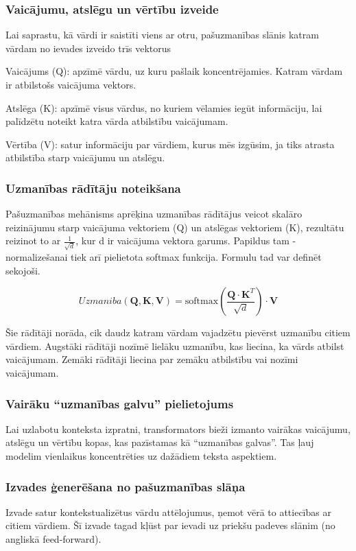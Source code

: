 \subsubsection{Vaicājumu, atslēgu un vērtību izveide}
Lai saprastu, kā vārdi ir saistīti viens ar otru, pašuzmanības slānis katram vārdam no ievades izveido trīs vektorus

Vaicājums (Q): apzīmē vārdu, uz kuru pašlaik koncentrējamies. Katram vārdam ir atbilstošs vaicājuma vektors.

Atslēga (K): apzīmē visus vārdus, no kuriem vēlamies iegūt informāciju, lai palīdzētu noteikt katra vārda atbilstību vaicājumam.

Vērtība (V): satur informāciju par vārdiem, kurus mēs izgūsim, ja tiks atrasta atbilstība starp vaicājumu un atslēgu.

\subsubsection{Uzmanības rādītāju noteikšana}

Pašuzmanības mehānisms aprēķina uzmanības rādītājus veicot skalāro reizinājumu starp vaicājuma vektoriem (Q) un atslēgas vektoriem (K), rezultātu reizinot to ar \(\frac{1}{\sqrt{d}}\), kur d ir vaicājuma vektora garums. Papildus tam - normalizešanai tiek arī pielietota softmax funkcija. Formulu tad var definēt sekojoši.

\begin{equation}
Uzmaniba(\mathbf{Q}, \mathbf{K}, \mathbf{V}) = \text{softmax}\left(\frac{\mathbf{Q} \cdot \mathbf{K}^T}{\sqrt{d}}\right) \cdot \mathbf{V}
\end{equation}

Šie rādītāji norāda, cik daudz katram vārdam vajadzētu pievērst uzmanību citiem vārdiem. Augstāki rādītāji nozīmē lielāku uzmanību, kas liecina, ka vārds atbilst vaicājumam. Zemāki rādītāji liecina par zemāku atbilstību vai nozīmi vaicājumam. 

\subsubsection{Vairāku “uzmanības galvu” pielietojums}

Lai uzlabotu konteksta izpratni, transformators bieži izmanto vairākas vaicājumu, atslēgu un vērtību kopas, kas pazīstamas kā “uzmanības galvas”. Tas ļauj modelim vienlaikus koncentrēties uz dažādiem teksta aspektiem.

\subsubsection{Izvades ģenerēšana no pašuzmanības slāņa}
Izvade satur kontekstualizētus vārdu attēlojumus, ņemot vērā to attiecības ar citiem vārdiem. Šī izvade tagad kļūst par ievadi uz priekšu padeves slānim (no angliskā feed-forward).

